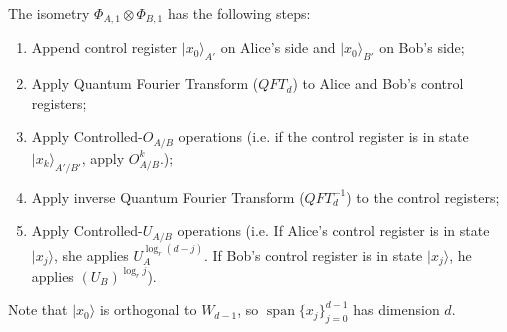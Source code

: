 \documentclass[11pt,letterpaper]{article}
\newcommand{\ket}[1]{|#1\rangle}
\newcommand{\x}{\otimes}
\DeclareMathOperator{\spn}{span}
\newcommand{\1}{\mathbb{1}}
\theoremstyle{definition}
\begin{document}
The isometry $\Phi_{A,1} \x \Phi_{B,1}$ has the following steps:
\begin{enumerate}
	\item Append control register $\ket{x_0}_{A'}$ on Alice's side and $\ket{x_0}_{B'}$ on Bob's side;
	\item Apply Quantum Fourier Transform ($QFT_d$) to Alice and Bob's control registers;
	\item Apply Controlled-$O_{A/B}$ operations (i.e. if the control register is in state $\ket{x_k}_{A'/ B'}$, apply
	$O_{A/B}^k$.);
	\item Apply inverse Quantum Fourier Transform ($QFT_d^{-1}$) to the control registers;
	\item Apply Controlled-$U_{A/B}$ operations (i.e. If Alice's control register is in state $\ket{x_j}$, she applies
	$U_A^{\log_r (d-j)}$. If Bob's control register is in state $\ket{x_j}$, he applies $(U_B)^{\log_r j}$).
\end{enumerate}
Note that $\ket{x_0}$ is orthogonal to $W_{d-1}$, so
$\spn\{ x_j \}_{j=0}^{d-1}$ has dimension $d$.
\end{document}
